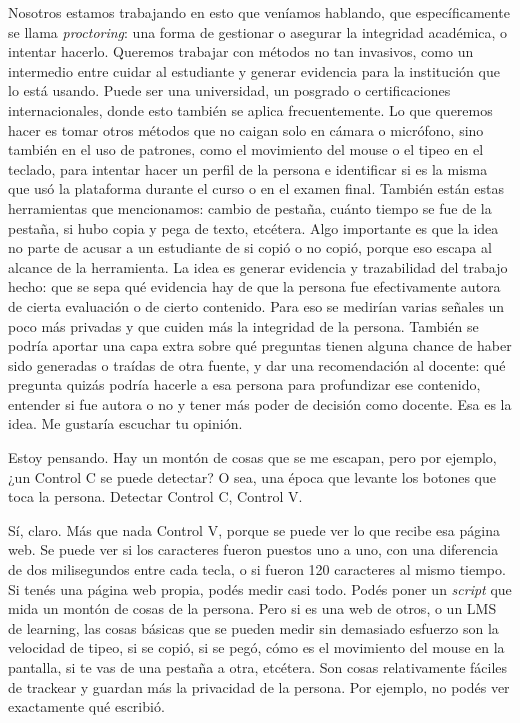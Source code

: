 \begin{description}[leftmargin=0cm, labelsep=0.5cm, style=nextline]
\item[\textbf{Entrevistadores:}] Nosotros estamos trabajando en esto que veníamos hablando, que específicamente se llama \textit{proctoring}: una forma de gestionar o asegurar la integridad académica, o intentar hacerlo. Queremos trabajar con métodos no tan invasivos, como un intermedio entre cuidar al estudiante y generar evidencia para la institución que lo está usando. Puede ser una universidad, un posgrado o certificaciones internacionales, donde esto también se aplica frecuentemente. Lo que queremos hacer es tomar otros métodos que no caigan solo en cámara o micrófono, sino también en el uso de patrones, como el movimiento del mouse o el tipeo en el teclado, para intentar hacer un perfil de la persona e identificar si es la misma que usó la plataforma durante el curso o en el examen final. También están estas herramientas que mencionamos: cambio de pestaña, cuánto tiempo se fue de la pestaña, si hubo copia y pega de texto, etcétera. Algo importante es que la idea no parte de acusar a un estudiante de si copió o no copió, porque eso escapa al alcance de la herramienta. La idea es generar evidencia y trazabilidad del trabajo hecho: que se sepa qué evidencia hay de que la persona fue efectivamente autora de cierta evaluación o de cierto contenido. Para eso se medirían varias señales un poco más privadas y que cuiden más la integridad de la persona. También se podría aportar una capa extra sobre qué preguntas tienen alguna chance de haber sido generadas o traídas de otra fuente, y dar una recomendación al docente: qué pregunta quizás podría hacerle a esa persona para profundizar ese contenido, entender si fue autora o no y tener más poder de decisión como docente. Esa es la idea. Me gustaría escuchar tu opinión.
\item[\textbf{Entrevistado:}] Estoy pensando. Hay un montón de cosas que se me escapan, pero por ejemplo, ¿un Control C se puede detectar? O sea, una época que levante los botones que toca la persona. Detectar Control C, Control V.
\item[\textbf{Entrevistadores:}] Sí, claro. Más que nada Control V, porque se puede ver lo que recibe esa página web. Se puede ver si los caracteres fueron puestos uno a uno, con una diferencia de dos milisegundos entre cada tecla, o si fueron 120 caracteres al mismo tiempo. Si tenés una página web propia, podés medir casi todo. Podés poner un \textit{script} que mida un montón de cosas de la persona. Pero si es una web de otros, o un LMS de learning, las cosas básicas que se pueden medir sin demasiado esfuerzo son la velocidad de tipeo, si se copió, si se pegó, cómo es el movimiento del mouse en la pantalla, si te vas de una pestaña a otra, etcétera. Son cosas relativamente fáciles de trackear y guardan más la privacidad de la persona. Por ejemplo, no podés ver exactamente qué escribió.

\end{description}
